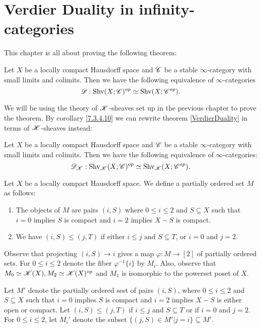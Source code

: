 \documentclass[../thesis.tex]{subfiles}
\begin{document}
\section{Verdier Duality in infinity-categories}
This chapter is all about proving the following theorem:
\begin{theorem}[{\cite[][Theorem 5.5.5.1]{HA}}]\label{VerdierDuality}
    Let $X$ be a locally compact Hausdorff space and $\mathscr{C}$ be a stable $\infty$-category with small limits and colimits.
    Then we have the following equivalence of $\infty$-categories
    \[
        \mathscr{D} : \mathrm{Shv}(X;\mathscr{C})^{op} \simeq \mathrm{Shv}(X;\mathscr{C}^{op}).
    \]
\end{theorem}
We will be using the theory of $\mathscr{K}$-sheaves set up in the previous chapter to prove the theorem.
By corollary \ref{7.3.4.10} we can rewrite theorem \ref{VerdierDuality} in terms of $\mathscr{K}$-sheaves instead:
\begin{theorem}\label{KVerdierDuality}
    Let $X$ be a locally compact Hausdorff space and $\mathscr{C}$ be a stable $\infty$-category with small limits and colimits.
    Then we have the following equivalence of $\infty$-categories:
    \[
        \mathscr{D}_{\mathscr{K}} : \mathrm{Shv}_{\mathscr{K}}(X;\mathscr{C})^{op} \simeq \mathrm{Shv}_{\mathscr{K}}(X;\mathscr{C}^{op}).
    \]
\end{theorem}
\begin{definition}[{\cite[Notation 5.5.5.5]{HA}}]\label{5.5.5.5}
    Let $X$ be a locally compact Hausdorff space.
    We define a partially ordered set $M$ as follows:
    \begin{enumerate}
        \item The objects of $M$ are pairs $(i,S)$ where $0 \leq i \leq 2$ and $S \subseteq X$ such that $i=0$ implies $S$ is compact and $i=2$ implies $X-S$ is compact.
        \item We have $(i,S) \leq (j,T)$ if either $i\leq j$ and $S\subseteq T$, or $i=0$ and $j=2$.
    \end{enumerate}
\end{definition}
\begin{remark}[{\cite[Remark 5.5.5.6]{HA}}]
    Observe that projecting $(i,S) \to i$ gives a map $\varphi: M \to [2]$ of partially ordered sets.
    For $0 \leq i \leq 2$ denote the fiber $\varphi^{-1}\{i\}$ by $M_i$.
    Also, observe that $M_0 \simeq \mathscr{K}(X), M_2\simeq \mathscr{K}(X)^{op}$ and $M_1$ is isomorphic to the powerset poset of $X$.
\end{remark}
\begin{definition}
    Let $M'$ denote the partially ordered sest of pairs $(i,S)$, where $0 \leq i \leq 2$ and $S \subseteq X$ such that $i=0$ implies $S$ is compact and $i=2$ implies $X-S$ is either open or compact.
    Let $(i, S) \leq (j,T)$ if $i\leq j$ and $S\subseteq T$ or if $i=0$ and $j=2$.
    For $0 \leq i \leq 2$, let $M_i'$ denote the subset $\{(j,S) \in M' | j=i\} \subseteq M'$.
\end{definition}
\end{document}
